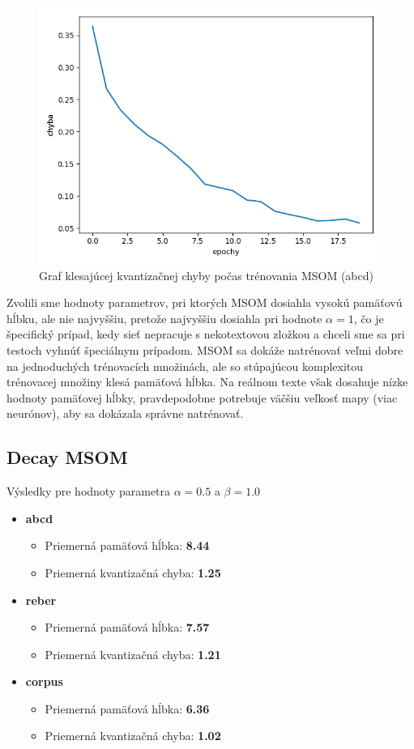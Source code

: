\begin{figure}[H]
    \centering
    \includegraphics[width=\textwidth]{assets/m_error_top}
    \caption{Graf klesajúcej kvantizačnej chyby počas trénovania MSOM (abcd)}
\end{figure}

Zvolili sme hodnoty parametrov, pri ktorých MSOM dosiahla vysokú pamäťovú hĺbku, ale nie najvyššiu, pretože 
najvyššiu dosiahla pri hodnote $\alpha = 1$, čo je špecifický prípad, kedy sieť nepracuje s nekotextovou zložkou a chceli 
sme sa pri testoch vyhnúť špeciálnym prípadom.
MSOM sa dokáže natrénovať veľmi dobre na jednoduchých trénovacích množinách, ale so stúpajúcou komplexitou trénovacej 
množiny klesá pamäťová hĺbka.
Na reálnom texte však dosahuje nízke hodnoty pamäťovej hĺbky, pravdepodobne 
potrebuje väčšiu veľkosť mapy (viac neurónov), aby sa dokázala správne natrénovať.


\subsection{Decay MSOM}
Výsledky pre hodnoty parametra $\alpha = 0.5$ a $\beta = 1.0$
\begin{itemize}
    \item \textbf{abcd}
    \begin{itemize}
        \item Priemerná pamäťová hĺbka: \textbf{8.44}
        \item Priemerná kvantizačná chyba: \textbf{1.25}
    \end{itemize}
    \item \textbf{reber}
    \begin{itemize}
        \item Priemerná pamäťová hĺbka: \textbf{7.57}
        \item Priemerná kvantizačná chyba: \textbf{1.21}    
    \end{itemize}
    \item \textbf{corpus}
    \begin{itemize}
        \item Priemerná pamäťová hĺbka: \textbf{6.36}
        \item Priemerná kvantizačná chyba: \textbf{1.02}
    \end{itemize}
\end{itemize}

